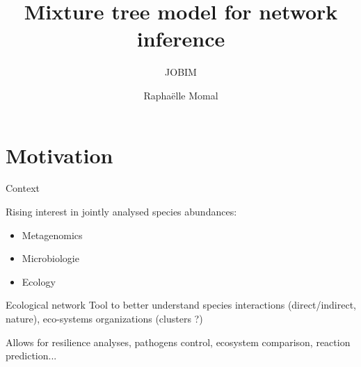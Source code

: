 \documentclass{beamer}
\title{Mixture tree model for network inference}
\subtitle{JOBIM}
\author{Raphaëlle Momal}
\institute{UMR518 AgroParis Tech/INRA}
\newcommand{\emphase}[1]{\textcolor{Complement}{#1}}
\begin{document}
\frame{\titlepage}


\section{Motivation}

\begin{frame}{Context}

Rising interest in \emphase{jointly analysed }species abundances:
\begin{itemize}
	\item Metagenomics 
	\item Microbiologie
	\item Ecology
\end{itemize}

\begin{block}{Ecological network}
Tool to better understand species interactions (direct/indirect, nature), eco-systems organizations (clusters ?) 
\end{block}\bigskip
Allows for resilience analyses, pathogens control, ecosystem comparison, reaction prediction...
\end{frame}
\end{document}
